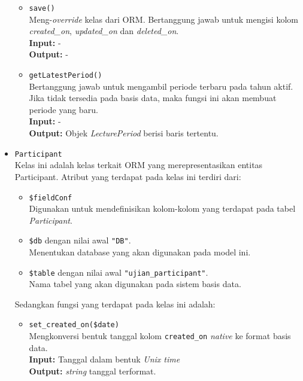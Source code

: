\begin{itemize}
\begin{itemize}
                \item \texttt{save()}\\
                    Meng-\textit{override} kelas dari ORM. Bertanggung jawab untuk mengisi
                    kolom \textit{created\_on}, \textit{updated\_on} dan \textit{deleted\_on}.\\
                    \textbf{Input:} -\\
                    \textbf{Output:} -
                    
                \item \texttt{getLatestPeriod()}\\
                    Bertanggung jawab untuk mengambil periode terbaru pada tahun aktif. Jika tidak
                    tersedia pada basis data, maka fungsi ini akan membuat periode yang baru.\\
                    \textbf{Input:} -\\
                    \textbf{Output:} Objek \textit{LecturePeriod} berisi baris tertentu.
            \end{itemize}
            
        \item \texttt{Participant} \\
            Kelas ini adalah kelas terkait ORM yang merepresentasikan entitas Participant. Atribut yang 
            terdapat pada kelas ini terdiri dari:
            \begin{itemize}
                \item \texttt{\$fieldConf} \\
                    Digunakan untuk mendefinisikan kolom-kolom yang terdapat pada tabel \textit{Participant}.
                \item \texttt{\$db} dengan nilai awal \texttt{"DB"}. \\
                    Menentukan database yang akan digunakan pada model ini.
                \item \texttt{\$table} dengan nilai awal \texttt{"ujian\_participant"}. \\
                    Nama tabel yang akan digunakan pada sistem basis data. 
            \end{itemize}
            Sedangkan fungsi yang terdapat pada kelas ini adalah:
            \begin{itemize}
                \item \texttt{set\_created\_on(\$date)} \\
                    Mengkonversi bentuk tanggal kolom \texttt{created\_on} \textit{native} ke 
                    format basis data. \\
                    \textbf{Input:} Tanggal dalam bentuk \textit{Unix time}\\
                    \textbf{Output:} \textit{string} tanggal terformat.
                

\end{itemize}
\end{itemize}
